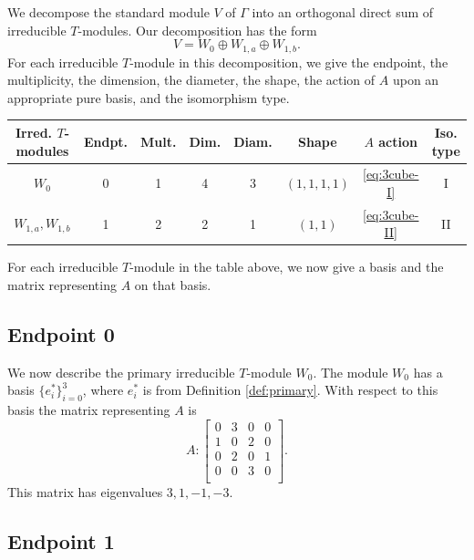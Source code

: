\documentclass[12pt,letterpaper]{article}
\begin{document}
We decompose the standard module $V$ of $\Gamma$ into an orthogonal direct sum of irreducible $T$-modules. Our decomposition has the form
\[ V = W_0 \oplus W_{1,a} \oplus W_{1,b}. \]
For each irreducible $T$-module in this decomposition, we give the endpoint, the multiplicity, the dimension, the diameter, the shape, the action of $A$ upon an appropriate pure basis, and the isomorphism type.

\begin{center}
\begin{tabular}{c | c c c c c c c}
\toprule
\textbf{Irred. $T$-modules} & \textbf{Endpt.} & \textbf{Mult.} & \textbf{Dim.} & \textbf{Diam.} & \textbf{Shape} & $A$ \textbf{action} & \textbf{Iso. type} \\
\midrule
$W_0$ & 0 & 1 & 4 & 3 & $(1,1,1,1)$ & \eqref{eq:3cube-I} & I \\
$W_{1,a}, W_{1,b}$ & 1 & 2 & 2 & 1 & $(1,1)$ & \eqref{eq:3cube-II} & II \\
\bottomrule
\end{tabular}

\smallskip
{}
\end{center}

For each irreducible $T$-module in the table above, we now give a basis and the matrix representing $A$ on that basis. 

\subsection{Endpoint 0}

We now describe the primary irreducible $T$-module $W_0$. The module $W_0$ has a basis $\{e_i^*\}_{i=0}^3$, where $e_i^*$ is from Definition \ref{def:primary}. With respect to this basis the matrix representing $A$ is
\begin{equation}
    A: \begin{bmatrix}
  0 & 3 & 0 & 0 \\
  1 & 0 & 2 & 0 \\
  0 & 2 & 0 & 1 \\
  0 & 0 & 3 & 0 \\
\end{bmatrix}.
\label{eq:3cube-I}
\end{equation}
This matrix has eigenvalues $3, 1, -1, -3$.

\subsection{Endpoint 1}
\end{document}
